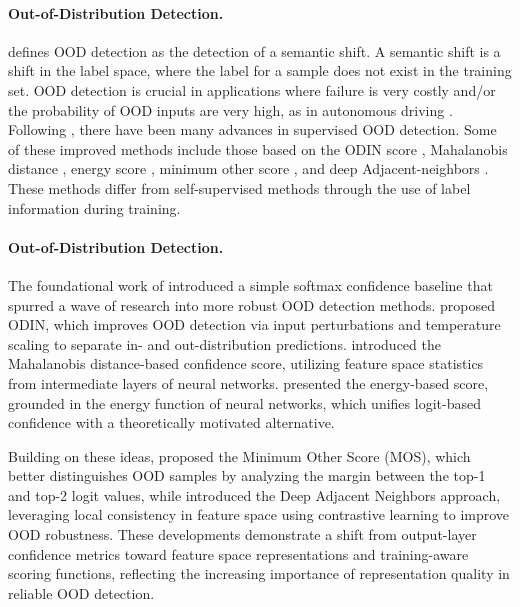 \documentclass{article} %
\theoremstyle{plain}
\theoremstyle{definition}
\theoremstyle{remark}
\begin{document}
\paragraph{Out-of-Distribution Detection.}
\citep{yang2021generalized} defines OOD detection as the detection of a semantic shift. A semantic shift is a shift in the label space, where the label for a sample does not exist in the training set. OOD detection is crucial in applications where failure is very costly and/or the probability of OOD inputs are very high, as in autonomous driving \citep{huang2020survey}. Following \citep{hendrycks2016baseline}, there have been many advances in supervised OOD detection. Some of these improved methods include those based on the ODIN score \citep{liang2017enhancing}, Mahalanobis distance \citep{lee2018simple}, energy
score \citep{liu2020energy}, minimum other score \citep{huang2021mos}, and deep Adjacent-neighbors \citep{sun2022out}. These methods differ from self-supervised methods through the use of label information during training.

\paragraph{Out-of-Distribution Detection.} 
The foundational work of \citet{hendrycks2016baseline} introduced a simple softmax confidence baseline that spurred a wave of research into more robust OOD detection methods. \citet{liang2017enhancing} proposed ODIN, which improves OOD detection via input perturbations and temperature scaling to separate in- and out-distribution predictions. \citet{lee2018simple} introduced the Mahalanobis distance-based confidence score, utilizing feature space statistics from intermediate layers of neural networks. \citet{liu2020energy} presented the energy-based score, grounded in the energy function of neural networks, which unifies logit-based confidence with a theoretically motivated alternative.

Building on these ideas, \citet{huang2021mos} proposed the Minimum Other Score (MOS), which better distinguishes OOD samples by analyzing the margin between the top-1 and top-2 logit values, while \citet{sun2022out} introduced the Deep Adjacent Neighbors approach, leveraging local consistency in feature space using contrastive learning to improve OOD robustness. These developments demonstrate a shift from output-layer confidence metrics toward feature space representations and training-aware scoring functions, reflecting the increasing importance of representation quality in reliable OOD detection.
\end{document}
